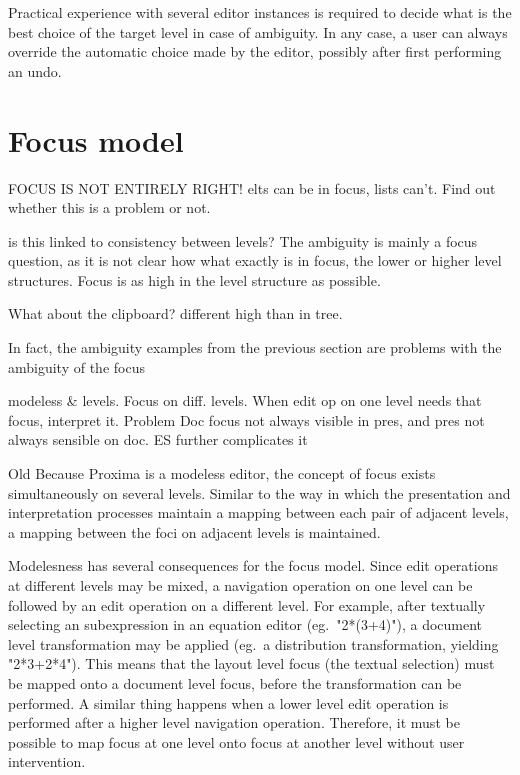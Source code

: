 Practical experience with several editor instances is required to decide what is the best choice of the target level in case of ambiguity. In any case, a user can always override the automatic choice made by the editor, possibly after first performing an undo.




%																
%																
%																
\section{Focus model} \label{sect:focus}
\bc
FOCUS IS NOT ENTIRELY RIGHT! elts can be  in focus, lists can't. Find out whether this is a problem or not.
\ec


\bc
is this linked to consistency between levels?
The ambiguity is mainly a focus question, as it is not clear how what exactly is in focus, the lower or higher level structures. Focus is as high in the level structure as possible.

What about the clipboard?
different high than in tree.

In fact, the ambiguity examples from the previous section are problems with the ambiguity of the focus
\ec

\bc modeless & levels. Focus on diff. levels. When edit op on one level needs that focus, interpret it. Problem Doc focus not always visible in pres, and pres not always sensible on doc. ES further complicates it
\ec


\bc Old
Because Proxima is a modeless editor, the concept of focus exists simultaneously on several levels.  Similar to the way in which the presentation and interpretation processes maintain a mapping between each pair of adjacent levels, a mapping between the foci on adjacent levels is maintained. 
\ec

Modelesness has several consequences for the focus model. Since edit operations at different levels may be mixed, a navigation operation on one level can be followed by an edit operation on a different level. For example, after textually selecting an subexpression in an equation editor (eg.\ "2*(3+4)"), a document level transformation may be applied (eg.\ a distribution transformation, yielding "2*3+2*4"). This means that the layout level focus (the textual selection) must be mapped onto a document level focus, before the transformation can be performed. A similar thing happens when a lower level edit operation is performed after a higher level navigation operation. Therefore, it must be possible to map focus at one level onto focus at another level without user intervention.

